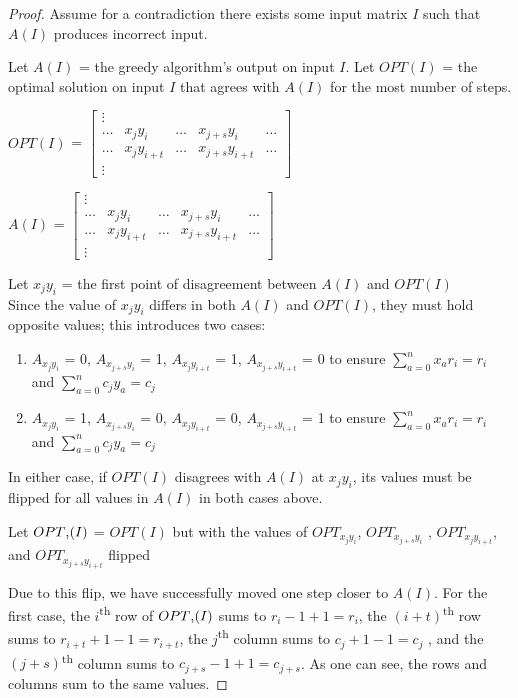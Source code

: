 \documentclass{article}
\begin{document}
	\begin{proof}
	Assume for a contradiction there exists some input matrix $I$ such that $A(I)$ produces incorrect input.
	
	Let $A(I)$ = the greedy algorithm's output on input $I$.
	Let $OPT(I)$ = the optimal solution on input $I$ that agrees
	with $A(I)$ for the most number of steps.
 	
	$OPT(I)$ = 
	$\begin{bmatrix}
		\vdots \\
		\dots & x_{j}y_{i} & \dots & x_{j+s}y_{i} & \dots \\
		\dots & x_{j}y_{i+t} & \dots & x_{j+s}y_{i+t} & \dots \\
		\vdots
	\end{bmatrix}$
	
	$A(I)$ = %
	$\begin{bmatrix}
		\vdots \\
		\dots & x_{j}y_{i} & \dots & x_{j+s}y_{i} & \dots \\
		\dots & x_{j}y_{i+t} & \dots & x_{j+s}y_{i+t} & \dots \\
		\vdots
	\end{bmatrix} $

	Let $x_jy_i$ = the first point of disagreement between $A(I)$ and $OPT(I)$\\
	Since the value of $x_jy_i$ differs in both $A(I)$ and $OPT(I)$, they must hold opposite values; this introduces two cases:
	\begin{enumerate}
		\item $A_{x_{j}y_{i}}$ = 0, $A_{x_{j+s}y_{i}}$ = 1, $A_{x_{j}y_{i+t}}$ = 1, $A_{x_{j+s}y_{i+t}}$ = 0 to ensure $\sum_{a=0}^{n} x_ar_i = r_i$ and $\sum_{a=0}^{n} c_jy_a = c_j$
		\item $A_{x_{j}y_{i}}$ = 1, $A_{x_{j+s}y_{i}}$ = 0, $A_{x_{j}y_{i+t}}$ = 0, $A_{x_{j+s}y_{i+t}}$ = 1 to ensure $\sum_{a=0}^{n} x_ar_i = r_i$ and $\sum_{a=0}^{n} c_jy_a = c_j$
	\end{enumerate}
	
	In either case, if $OPT(I)$ disagrees with $A(I)$ at $x_jy_i$, its values must be flipped for all values in $A(I)$ in both cases
	above.
	
	Let $OPT\textsc{\char13}(I)$ = $OPT(I)$ but with the values of $OPT_{x_jy_i}$, $OPT_{x_{j+s}y_i}$ , $OPT_{x_jy_{i+t}}$, and $OPT_{x_{j+s}y_{i+t}}$ flipped
		
	Due to this flip, we have successfully moved one step closer to $A(I)$. For the first case, the $i$\textsuperscript{th} row of $OPT\textsc{\char13}(I)$
	sums to $r_i - 1 + 1 = r_i$, the $(i + t)$\textsuperscript{th} row sums to $r_{i+t} + 1 - 1 = r_{i+t}$, the $j$\textsuperscript{th} column sums to $c_j + 1 - 1 = c_j$ , and the $(j + s)$\textsuperscript{th} column sums to $c_{j+s} - 1 + 1 = c_{j+s}$. As one can see, the rows and columns sum to the same values.
	

\end{proof}
\end{document}
